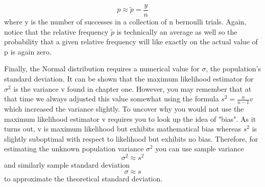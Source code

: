 \documentclass[10pt,]{book}
\numberwithin{equation}{section}
\begin{document}
\begin{equation*}
p \approx \tilde{p} = \frac{y}{n}
\end{equation*}
where y is the number of successes in a collection of n bernoulli trials. Again, notice that the relative frequency \(\tilde{p}\) is technically an average as well so the probability that a given relative frequency will like exactly on the actual value of p is again zero.%
\par
\hypertarget{p-1107}{}%
Finally, the Normal distribution requires a numerical value for \(\sigma\), the population's standard deviation. It can be shown that the maximum likelihood estimator for \(\sigma^2\) is the variance v found in chapter one. However, you may remember that at that time we always adjusted this value somewhat using the formula \(s^2 = \frac{n}{n-1} v\) which increased the variance slightly. To uncover why you would not use the maximum likelihood estimator v requires you to look up the idea of "bias". As it turns out, v is maximum likelihood but exhibits mathematical bias whereas \(s^2\) is slightly suboptimal with respect to likelihood but exhibits no bias. Therefore, for estimating the unknown population variance \(\sigma^2\) you can use sample variance%
\begin{equation*}
\sigma^2 \approx s^2
\end{equation*}
and similarly sample standard deviation%
\begin{equation*}
\sigma \approx s
\end{equation*}
to approximate the theoretical standard deviation.%
%
%
\typeout{************************************************}
\typeout{************************************************}
%
\end{document}
